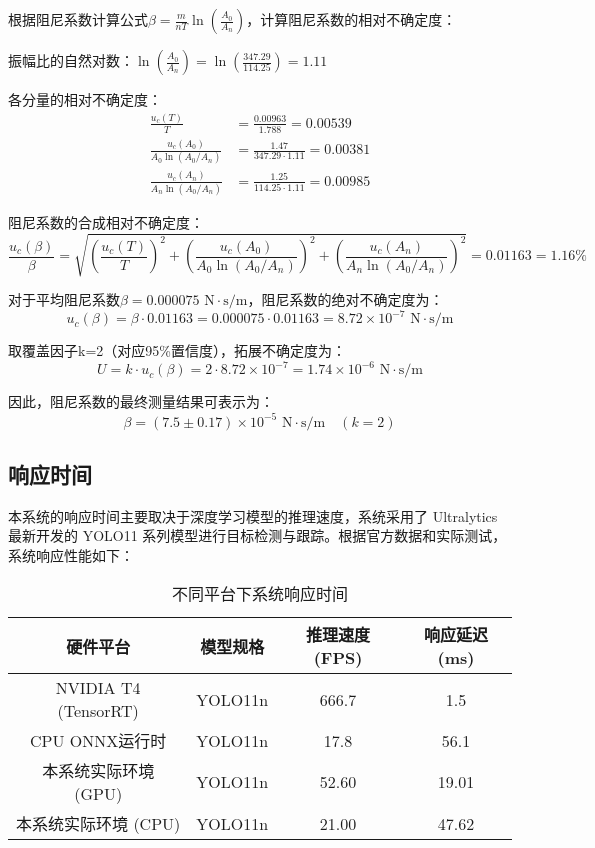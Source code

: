 \begin{enumerate}[leftmargin=*]
根据阻尼系数计算公式$\beta = \frac{m}{nT}\ln\left(\frac{A_0}{A_n}\right)$，计算阻尼系数的相对不确定度：

振幅比的自然对数：$\ln\left(\frac{A_0}{A_n}\right) = \ln\left(\frac{347.29}{114.25}\right) = 1.11$

各分量的相对不确定度：
\begin{align}
\frac{u_c(T)}{T} &= \frac{0.00963}{1.788} = 0.00539 \\
\frac{u_c(A_0)}{A_0 \ln(A_0/A_n)} &= \frac{1.47}{347.29 \cdot 1.11} = 0.00381 \\
\frac{u_c(A_n)}{A_n \ln(A_0/A_n)} &= \frac{1.25}{114.25 \cdot 1.11} = 0.00985
\end{align}

阻尼系数的合成相对不确定度：
\begin{equation}
\frac{u_c(\beta)}{\beta} = \sqrt{\left(\frac{u_c(T)}{T}\right)^2 + \left(\frac{u_c(A_0)}{A_0 \ln(A_0/A_n)}\right)^2 + \left(\frac{u_c(A_n)}{A_n \ln(A_0/A_n)}\right)^2} = 0.01163 = 1.16\%
\end{equation}

对于平均阻尼系数$\beta = 0.000075 \text{ N}\cdot\text{s/m}$，阻尼系数的绝对不确定度为：
\begin{equation}
u_c(\beta) = \beta \cdot 0.01163 = 0.000075 \cdot 0.01163 = 8.72 \times 10^{-7} \text{ N}\cdot\text{s/m}
\end{equation}

取覆盖因子k=2（对应95\%置信度），拓展不确定度为：
\begin{equation}
U = k \cdot u_c(\beta) = 2 \cdot 8.72 \times 10^{-7} = 1.74 \times 10^{-6} \text{ N}\cdot\text{s/m}
\end{equation}

因此，阻尼系数的最终测量结果可表示为：
\begin{equation}
\beta = (7.5 \pm 0.17) \times 10^{-5} \text{ N}\cdot\text{s/m} \quad (k=2)
\end{equation}
\end{enumerate}

\subsection{响应时间}
本系统的响应时间主要取决于深度学习模型的推理速度，系统采用了 Ultralytics 最新开发的 YOLO11 系列模型进行目标检测与跟踪。根据官方数据和实际测试，系统响应性能如下：

\begin{table}[H]
\centering
\caption{不同平台下系统响应时间}
\begin{tabular}{@{}c c c c@{}}
\toprule
\textbf{硬件平台} & \textbf{模型规格} & \textbf{推理速度(FPS)} & \textbf{响应延迟(ms)} \\
\midrule
NVIDIA T4 (TensorRT) & YOLO11n & 666.7 & 1.5 \\
CPU ONNX运行时 & YOLO11n & 17.8 & 56.1 \\
本系统实际环境 (GPU) & YOLO11n & 52.60 & 19.01 \\
本系统实际环境 (CPU) & YOLO11n & 21.00 & 47.62 \\
\bottomrule
\end{tabular}
\label{tab:response_time}
\end{table}

